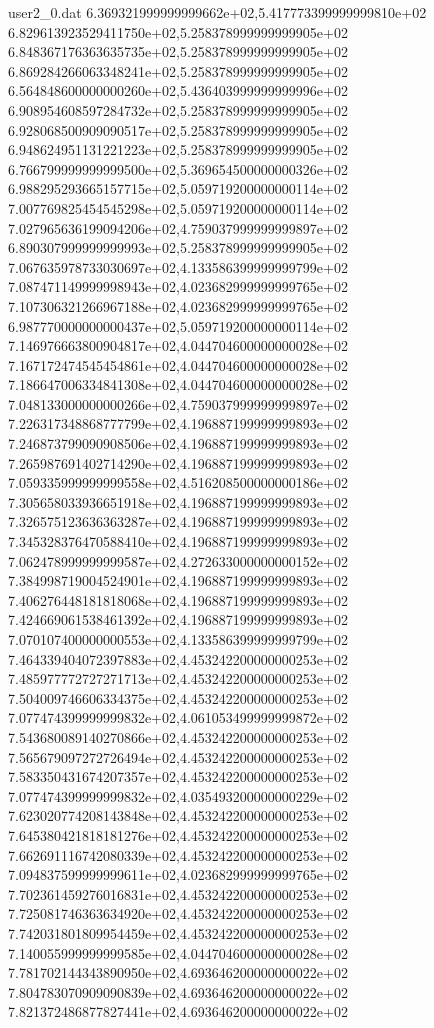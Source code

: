 \begin{filecontents}{user2_0.dat}
6.369321999999999662e+02,5.417773399999999810e+02
6.829613923529411750e+02,5.258378999999999905e+02
6.848367176363635735e+02,5.258378999999999905e+02
6.869284266063348241e+02,5.258378999999999905e+02
6.564848600000000260e+02,5.436403999999999996e+02
6.908954608597284732e+02,5.258378999999999905e+02
6.928068500909090517e+02,5.258378999999999905e+02
6.948624951131221223e+02,5.258378999999999905e+02
6.766799999999999500e+02,5.369654500000000326e+02
6.988295293665157715e+02,5.059719200000000114e+02
7.007769825454545298e+02,5.059719200000000114e+02
7.027965636199094206e+02,4.759037999999999897e+02
6.890307999999999993e+02,5.258378999999999905e+02
7.067635978733030697e+02,4.133586399999999799e+02
7.087471149999998943e+02,4.023682999999999765e+02
7.107306321266967188e+02,4.023682999999999765e+02
6.987770000000000437e+02,5.059719200000000114e+02
7.146976663800904817e+02,4.044704600000000028e+02
7.167172474545454861e+02,4.044704600000000028e+02
7.186647006334841308e+02,4.044704600000000028e+02
7.048133000000000266e+02,4.759037999999999897e+02
7.226317348868777799e+02,4.196887199999999893e+02
7.246873799090908506e+02,4.196887199999999893e+02
7.265987691402714290e+02,4.196887199999999893e+02
7.059335999999999558e+02,4.516208500000000186e+02
7.305658033936651918e+02,4.196887199999999893e+02
7.326575123636363287e+02,4.196887199999999893e+02
7.345328376470588410e+02,4.196887199999999893e+02
7.062478999999999587e+02,4.272633000000000152e+02
7.384998719004524901e+02,4.196887199999999893e+02
7.406276448181818068e+02,4.196887199999999893e+02
7.424669061538461392e+02,4.196887199999999893e+02
7.070107400000000553e+02,4.133586399999999799e+02
7.464339404072397883e+02,4.453242200000000253e+02
7.485977772727271713e+02,4.453242200000000253e+02
7.504009746606334375e+02,4.453242200000000253e+02
7.077474399999999832e+02,4.061053499999999872e+02
7.543680089140270866e+02,4.453242200000000253e+02
7.565679097272726494e+02,4.453242200000000253e+02
7.583350431674207357e+02,4.453242200000000253e+02
7.077474399999999832e+02,4.035493200000000229e+02
7.623020774208143848e+02,4.453242200000000253e+02
7.645380421818181276e+02,4.453242200000000253e+02
7.662691116742080339e+02,4.453242200000000253e+02
7.094837599999999611e+02,4.023682999999999765e+02
7.702361459276016831e+02,4.453242200000000253e+02
7.725081746363634920e+02,4.453242200000000253e+02
7.742031801809954459e+02,4.453242200000000253e+02
7.140055999999999585e+02,4.044704600000000028e+02
7.781702144343890950e+02,4.693646200000000022e+02
7.804783070909090839e+02,4.693646200000000022e+02
7.821372486877827441e+02,4.693646200000000022e+02

\end{filecontents}

